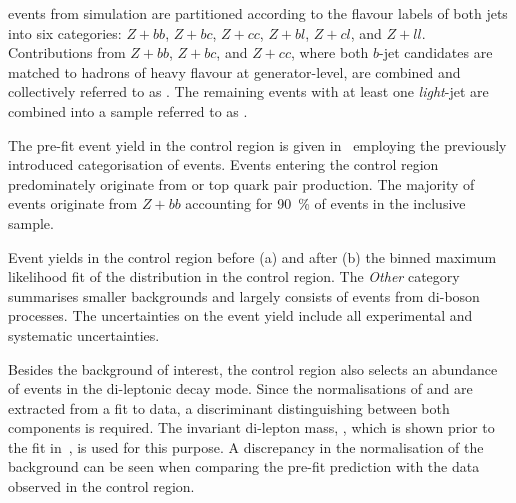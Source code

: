 \Zjets events from simulation are partitioned according to the flavour
labels of both \btagged jets into six categories: $Z + bb$, $Z + bc$,
$Z + cc$, $Z + bl$, $Z + cl$, and $Z + ll$. Contributions from
$Z + bb$, $Z + bc$, and $Z + cc$, where both $b$-jet candidates are
matched to hadrons of heavy flavour at generator-level, are combined
and collectively referred to as \ZHF. The remaining \Zjets events with
at least one \emph{light}-jet are combined into a sample referred to
as \ZLF.

The pre-fit event yield in the \ZHF control region is given
in~ employing the previously introduced
categorisation of \Zjets events. Events entering the control region
predominately originate from \ZHF or top quark pair production.
The majority of \ZHF events originate from $Z + bb$ accounting for
\SI{90}{\percent} of events in the inclusive \ZHF sample.

\begin{table}[htbp]
  \caption{Event yields in the \ZHF control region before (a) and
    after (b) the binned maximum likelihood fit of the \mll
    distribution in the control region. The \emph{Other} category
    summarises smaller backgrounds and largely consists of events from
    di-boson processes. The uncertainties on the event yield include
    all experimental and systematic uncertainties.}%
  \label{tab:zcr_yields}

  \begin{subtable}{0.5\textwidth}
    \centering

    \label{tab:zcr_prefit_yields}

    
  \end{subtable}
  \begin{subtable}{0.5\textwidth}
    \centering

    \label{tab:zcr_postfit_yields}

    
  \end{subtable}
\end{table}

Besides the \ZHF background of interest, the control region also
selects an abundance of \ttbar events in the di-leptonic decay
mode. Since the normalisations of \ttbar and \ZHF are extracted from a
fit to data, a discriminant distinguishing between both components is
required. The invariant di-lepton mass, \mll, which is shown prior to
the fit in~, is used for this purpose. A
discrepancy in the normalisation of the \ZHF background can be seen
when comparing the pre-fit prediction with the data observed in the
control region.

